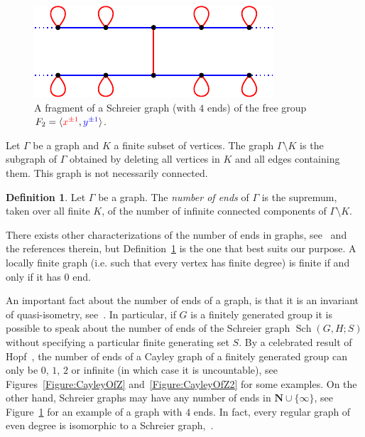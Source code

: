 \documentclass[a4paper]{article}
\theoremstyle{definition}
\newtheorem{defn}[lem]{Definition}
\theoremstyle{remark}
\DeclareMathOperator\Sch{Sch}
\begin{document}
%
%
%
%
%
\begin{figure}[htbp]\centering
\includegraphics{SchreierOfF2}
\caption{A fragment of a Schreier graph (with $4$ ends) of the free group $F_2=\langle \textcolor{red}{x^{\pm1}},\textcolor{blue}{y^{\pm1}}\rangle$.}
\label{Figure:SchreierOfF2}
\end{figure}
%
%

Let $\Gamma$ be a graph and $K$ a finite subset of vertices. The graph $\Gamma\setminus K$ is the subgraph of $\Gamma$ obtained by deleting all vertices in $K$ and all edges containing them. This graph is not necessarily connected.
\begin{defn}\label{Def:Ends}
Let $\Gamma$ be a graph. The \emph{number of ends} of $\Gamma$ is the supremum, taken over all finite $K$, of the number of infinite connected components of $\Gamma\setminus K$.
\end{defn}
There exists other characterizations of the number of ends in graphs, %
see~\cite{MR1967888} and the references therein, but Definition~\ref{Def:Ends} is the one that best suits our purpose.
A locally finite graph (i.e. such that every vertex has finite degree) is finite if and only if it has $0$ end.

An important fact about the number of ends of a graph, is that it is an invariant of quasi-isometry, see~\cite{MR1213151}. In particular, if $G$ is a finitely generated group it is possible to speak about the number of ends of the Schreier graph $\Sch(G,H;S)$ without specifying a particular finite generating set $S$.
By a celebrated result of Hopf~\cite{MR10267}, the number of ends of a Cayley graph of a finitely generated group can only be $0$, $1$, $2$ or infinite (in which case it is uncountable), see Figures~\ref{Figure:CayleyOfZ} and~\ref{Figure:CayleyOfZ2} for some examples.
On the other hand, Schreier graphs may have any number of ends in $\mathbf N\cup\{\infty\}$, see Figure~\ref{Figure:SchreierOfF2} for an example of a graph with $4$ ends.
In fact, every regular graph of even degree is isomorphic to a Schreier graph,~\cite{MR0450121,MR1358635}.
\end{document}
